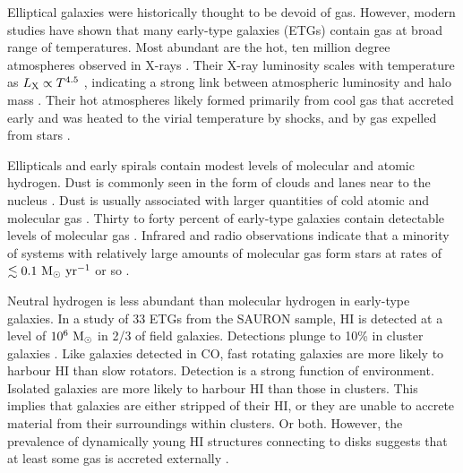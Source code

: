 \documentclass[iop]{emulateapj}
\begin{document}
Elliptical galaxies were historically thought to be devoid of gas.  However, modern studies have shown that many early-type galaxies (ETGs) contain gas at broad range of temperatures.  Most abundant are the hot, ten million degree atmospheres observed in X-rays \citep{Forman:85, Trinchieri:85, Mathews:03, Kim:15}. Their X-ray luminosity scales with temperature as $L_{\rm X} \propto T^{4.5}$ \citep{Boroson:10, Kim:13, Babyk:17scal}, indicating a strong link between atmospheric luminosity and halo mass \citep{Forbes:17}. Their hot atmospheres likely formed primarily from cool gas that accreted early and was heated to the virial temperature by shocks, and by gas expelled from stars \citep{Goulding:16}.

Ellipticals and early spirals contain modest levels of molecular and atomic hydrogen.  Dust is commonly  seen in the form of clouds and lanes near to the nucleus \citep{Sadler:85, Goudfrooij:94, Vandokkum:95}.  Dust is usually associated with larger quantities of cold atomic and molecular gas \citep{Combes:07}. Thirty to forty percent of early-type galaxies contain detectable levels of molecular gas \citep{Combes:07, Salome:11, Young:11}. Infrared and radio observations indicate that a minority of systems with relatively large amounts of molecular gas form stars at rates of $\lesssim 0.1~\rm M_\odot ~yr^{-1}$ or so \citep{Combes:07, Shapiro:10, Ford:13}.   

Neutral hydrogen is less abundant than molecular hydrogen in early-type galaxies. In a study of 33 ETGs from the SAURON sample, HI is detected at a level of $10^6~\rm M_\odot$ in 2/3 of field galaxies.  Detections plunge to 10\% in cluster galaxies \citep{Oosterloo:10, Pulatova:15}. Like galaxies detected in CO, fast rotating galaxies are more likely to harbour HI than slow rotators. Detection is a strong function of environment. Isolated galaxies are more likely to harbour HI than those in clusters. This implies that galaxies are either stripped of their HI,  or they are unable to accrete material from their surroundings within clusters. Or both.  However, the prevalence of dynamically young HI structures connecting to disks suggests that at least some gas is accreted externally \citep{Oosterloo:10}.
\end{document}
